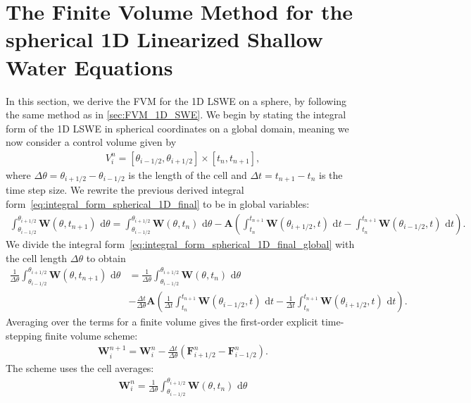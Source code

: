 \section{The Finite Volume Method for the spherical 1D Linearized Shallow Water Equations}
In this section, we derive the FVM for the 1D LSWE on a sphere, by following the same method as in \autoref{sec:FVM_1D_SWE}.
We begin by stating the integral form of the 1D LSWE in spherical coordinates on a global domain, meaning we now consider a control volume given by 
\begin{align*}
    V_i^n = [\theta_{i-1/2}, \theta_{i+1/2}] \times [t_n, t_{n+1}],
\end{align*}
where $\Delta \theta = \theta_{i+1/2} - \theta_{i-1/2}$ is the length of the cell and $\Delta t = t_{n+1} - t_n$ is the time step size.
We rewrite the previous derived integral form~\eqref{eq:integral_form_spherical_1D_final} to be in global variables:
\begin{align}\label{eq:integral_form_spherical_1D_final_global}
    \int_{\theta_{i-1/2}}^{\theta_{i+1/2}} \mathbf{W}(\theta, t_{n+1}) \text{ d}\theta = \int_{\theta_{i-1/2}}^{\theta_{i+1/2}} \mathbf{W}(\theta, t_n) \text{ d}\theta
    - \mathbf{A} \left( \int_{t_n}^{t_{n+1}} \mathbf{W}(\theta_{i+1/2}, t) \text{ d}t - \int_{t_n}^{t_{n+1}} \mathbf{W}(\theta_{i-1/2}, t) \text{ d}t \right).
\end{align}
We divide the integral form~\eqref{eq:integral_form_spherical_1D_final_global} with the cell length $\Delta \theta$ to obtain
\begin{align*}
    \frac{1}{\Delta \theta} \int_{\theta_{i-1/2}}^{\theta_{i+1/2}} \mathbf{W}(\theta, t_{n+1}) \text{ d}\theta &=
    \frac{1}{\Delta \theta} \int_{\theta_{i-1/2}}^{\theta_{i+1/2}} \mathbf{W}(\theta, t_n) \text{ d}\theta \\
    &- \frac{\Delta t}{\Delta \theta} \mathbf{A} \left( \frac{1}{\Delta t} \int_{t_n}^{t_{n+1}} \mathbf{W}(\theta_{i-1/2}, t) \text{ d}t - \frac{1}{\Delta t} \int_{t_n}^{t_{n+1}} \mathbf{W}(\theta_{i+1/2}, t) \text{ d}t\right) .
\end{align*}
Averaging over the terms for a finite volume gives the first-order explicit time-stepping finite volume scheme:
\begin{align}
    \mathbf{W}_i^{n+1} = \mathbf{W}_i^n - \frac{\Delta t}{\Delta \theta} (\mathbf{F}_{i+1/2}^n - \mathbf{F}_{i-1/2}^n).
\end{align}
The scheme uses the cell averages:
\begin{align*}
    \mathbf{W}_i^{n} = \frac{1}{\Delta \theta} \int_{\theta_{i-1/2}}^{\theta_{i+1/2}} \mathbf{W}(\theta, t_n) \text{ d}\theta
\end{align*}
